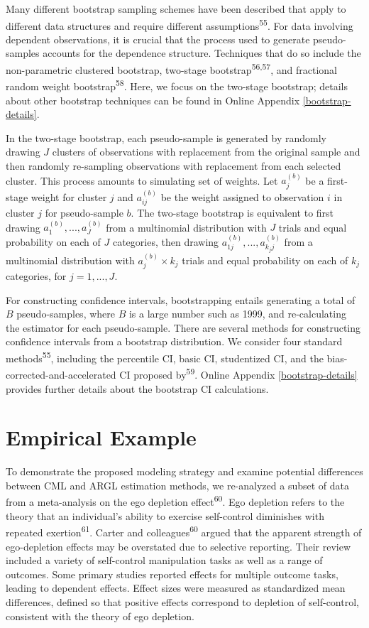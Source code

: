 \documentclass[
  american,
  man, donotrepeattitle,floatsintext]{apa7}
\begin{document}
Many different bootstrap sampling schemes have been described that apply to different data structures and require different assumptions\textsuperscript{55}.
For data involving dependent observations, it is crucial that the process used to generate pseudo-samples accounts for the dependence structure.
Techniques that do so include the non-parametric clustered bootstrap, two-stage bootstrap\textsuperscript{56,57}, and fractional random weight bootstrap\textsuperscript{58}.
Here, we focus on the two-stage bootstrap; details about other bootstrap techniques can be found in Online Appendix \ref{bootstrap-details}.

In the two-stage bootstrap, each pseudo-sample is generated by randomly drawing \(J\) clusters of observations with replacement from the original sample and then randomly re-sampling observations with replacement from each selected cluster.
This process amounts to simulating set of weights. Let \(a_j^{(b)}\) be a first-stage weight for cluster \(j\) and \(a_{ij}^{(b)}\) be the weight assigned to observation \(i\) in cluster \(j\) for pseudo-sample \(b\).
The two-stage bootstrap is equivalent to first drawing \(a_1^{(b)},...,a_J^{(b)}\) from a multinomial distribution with \(J\) trials and equal probability on each of \(J\) categories, then drawing \(a_{1j}^{(b)},...,a_{k_j j}^{(b)}\) from a multinomial distribution with \(a_j^{(b)} \times k_j\) trials and equal probability on each of \(k_j\) categories, for \(j = 1,...,J\).

For constructing confidence intervals, bootstrapping entails generating a total of \(B\) pseudo-samples, where \(B\) is a large number such as 1999, and re-calculating the estimator for each pseudo-sample.
There are several methods for constructing confidence intervals from a bootstrap distribution.
We consider four standard methods\textsuperscript{55}, including the percentile CI, basic CI, studentized CI, and the bias-corrected-and-accelerated CI proposed by\textsuperscript{59}.
Online Appendix \ref{bootstrap-details} provides further details about the bootstrap CI calculations.

\section{Empirical Example}\label{empirical-example}

To demonstrate the proposed modeling strategy and examine potential differences between CML and ARGL estimation methods, we re-analyzed a subset of data from a meta-analysis on the ego depletion effect\textsuperscript{60}.
Ego depletion refers to the theory that an individual's ability to exercise self-control diminishes with repeated exertion\textsuperscript{61}.
Carter and colleagues\textsuperscript{60} argued that the apparent strength of ego-depletion effects may be overstated due to selective reporting.
Their review included a variety of self-control manipulation tasks as well as a range of outcomes.
Some primary studies reported effects for multiple outcome tasks, leading to dependent effects.
Effect sizes were measured as standardized mean differences, defined so that positive effects correspond to depletion of self-control, consistent with the theory of ego depletion.
\end{document}
